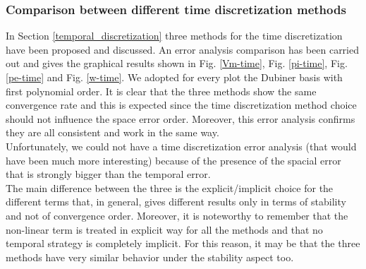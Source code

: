 \documentclass[a4paper,11pt]{article}
\begin{document}
\subsubsection{Comparison between different time discretization methods}
In Section \ref{temporal_discretization} three methods for the time discretization have been proposed and discussed. An error analysis comparison has been carried out and gives the graphical results shown in Fig. \ref{Vm-time}, Fig. \ref{pi-time}, Fig. \ref{pe-time} and Fig. \ref{w-time}. We adopted for every plot the Dubiner basis with first polynomial order.
\noindent It is clear that the three methods show the same convergence rate and this is expected since the time discretization method choice should not influence the space error order. Moreover, this error analysis confirms they are all consistent and work in the same way. \\
Unfortunately, we could not have a time discretization error analysis (that would have been much more interesting) because of the presence of the spacial error that is strongly bigger than the temporal error. \\
The main difference between the three is the explicit/implicit choice for the different terms that, in general, gives different results only in terms of stability and not of convergence order. Moreover, it is noteworthy to remember that the non-linear term is treated in explicit way for all the methods and that no temporal strategy is completely implicit. For this reason, it may be that the three methods have very similar behavior under the stability aspect too.
\end{document}
